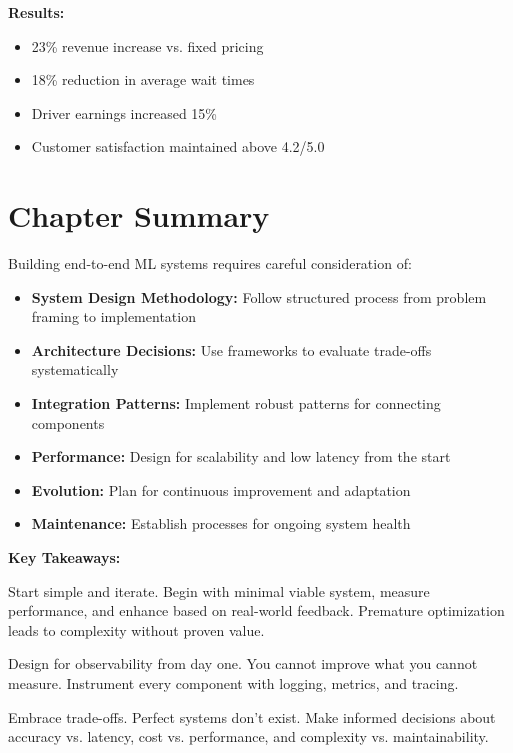 \textbf{Results:}
\begin{itemize}
    \item 23\% revenue increase vs. fixed pricing
    \item 18\% reduction in average wait times
    \item Driver earnings increased 15\%
    \item Customer satisfaction maintained above 4.2/5.0
\end{itemize}

\section{Chapter Summary}

Building end-to-end ML systems requires careful consideration of:

\begin{itemize}
    \item \textbf{System Design Methodology:} Follow structured process from problem framing to implementation
    \item \textbf{Architecture Decisions:} Use frameworks to evaluate trade-offs systematically
    \item \textbf{Integration Patterns:} Implement robust patterns for connecting components
    \item \textbf{Performance:} Design for scalability and low latency from the start
    \item \textbf{Evolution:} Plan for continuous improvement and adaptation
    \item \textbf{Maintenance:} Establish processes for ongoing system health
\end{itemize}

\textbf{Key Takeaways:}

\begin{bestpractice}
Start simple and iterate. Begin with minimal viable system, measure performance, and enhance based on real-world feedback. Premature optimization leads to complexity without proven value.
\end{bestpractice}

\begin{bestpractice}
Design for observability from day one. You cannot improve what you cannot measure. Instrument every component with logging, metrics, and tracing.
\end{bestpractice}

\begin{bestpractice}
Embrace trade-offs. Perfect systems don't exist. Make informed decisions about accuracy vs. latency, cost vs. performance, and complexity vs. maintainability.
\end{bestpractice}

